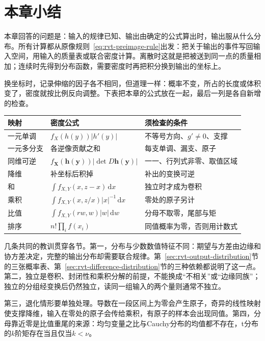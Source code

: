 \section{本章小结}
\label{sec:rvt-summary}

本章回答的问题是：输入的规律已知、输出由确定的公式算出时，输出服从什么分布。所有计算都从原像规则~\eqref{eq:rvt-preimage-rule}出发：把关于输出的事件写回输入空间，用输入的质量表或联合密度计算。离散时这就是把被送到同一点的质量相加；连续时先得到分布函数，需要密度时再把积分换到输出的坐标上。

换坐标时，记录伸缩的因子各不相同，但道理一样：概率不变，所占的长度或体积变了，密度就按比例反向调整。下表把本章的公式放在一起，最后一列是各自新增的检查。

\begin{BookInlineTable}
  \centering
  \small
  \begin{tabular}{@{}lll@{}}
    \toprule
    映射 & 密度公式 & 须检查的条件 \\
    \midrule
    一元单调 & $f_X(h(y))\lvert h'(y)\rvert$ & 不等号方向、$g'\neq0$、支撑 \\
    一元多分支 & 各逆像贡献之和 & 每支单调、漏支、原子 \\
    同维可逆 & $f_{\bm{X}}(\bm{h}(\bm{y}))\lvert\det D\bm{h}(\bm{y})\rvert$ & 一一、行列式非零、取值区域 \\
    降维 & 补坐标后积掉 & 补出的变换可逆 \\
    和 & $\int f_{X,Y}(x,z-x)\,\mathrm{d}x$ & 独立时才成为卷积 \\
    乘积 & $\int f_{X,Y}(x,z/x)\lvert x\rvert^{-1}\,\mathrm{d}x$ & 零处的原子另计 \\
    比值 & $\int f_{X,Y}(rw,w)\lvert w\rvert\,\mathrm{d}w$ & 分母不取零，尾部与矩 \\
    排序 & $n!\prod_if(x_i)$ & 同值概率为零，否则用计数式 \\
    \bottomrule
  \end{tabular}
  \caption{本章的变换公式与各自的条件。}
  \label{tab:rvt-summary}
\end{BookInlineTable}

几条共同的教训贯穿各节。第一，分布与少数数值特征不同：期望与方差由边缘和协方差决定，完整的输出分布却需要联合规律。第~\ref{sec:rvt-output-distribution}节的三张概率表、第~\ref{sec:rvt-difference-distribution}节的三种依赖都说明了这一点。第二，独立是卷积、封闭性和乘积分解的前提，不能换成“不相关”或“边缘同族”；独立的分组经变换后仍然独立，读同一组输入的两个量则通常不独立。

第三，退化情形要单独处理。导数在一段区间上为零会产生原子，奇异的线性映射使支撑降维，输入在零处的原子会传给乘积，有原子的样本会出现同值。第四，分母靠近零是比值重尾的来源：均匀变量之比与Cauchy分布的均值都不存在，t分布的$k$阶矩存在当且仅当$k<\nu$。

